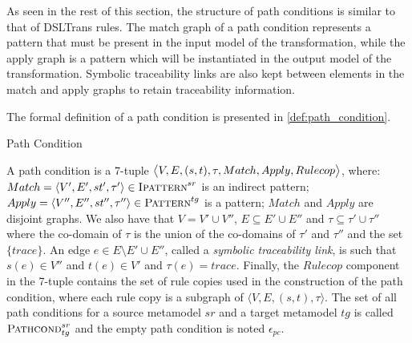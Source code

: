 
As seen in the rest of this section, the structure of path conditions is similar to that of DSLTrans rules. The match graph of a path condition represents a pattern that must be present in the input model of the transformation, while the apply graph is a pattern which will be instantiated in the output model of the transformation. Symbolic traceability links are also kept between elements in the match and apply graphs to retain traceability information.

The formal definition of a path condition is presented in \cref{def:path_condition}.

\begin{definition}{Path Condition\\}
\label{def:path_condition}

A path condition is a 7-tuple $\big\langle V,E,(s,t),\tau, Match,Apply,\\Rulecop\big\rangle$, where: $Match=\langle V',E',st',\tau'\rangle\in \textsc{Ipattern}^{sr}$ is an indirect pattern; $Apply=\langle V'',E'',st'',\tau''\rangle\in \textsc{Pattern}^{tg}$ is a pattern; $Match$ and $Apply$ are disjoint graphs. We also have that $V=V'\cup V''$, $E\subseteq E'\cup E''$ and $\tau\subseteq \tau'\cup \tau''$ where the co-domain of $\tau$ is the union of the co-domains of $\tau'$ and $\tau''$ and the set $\{trace\}$. An edge $e \in E\setminus E'\cup E''$, called a \emph{symbolic traceability link}, is such that $s(e)\in V''$ and $t(e)\in V'$ and $\tau(e)=trace$. Finally, the $Rulecop$ component in the 7-tuple contains the set of rule copies used in the construction of the path condition, where each rule copy is a subgraph of $\big\langle V,E,(s,t),\tau\big\rangle$. The set of all path conditions for a source metamodel $sr$ and a target metamodel $tg$ is called $\textsc{Pathcond}^{sr}_{tg}$ and the empty path condition is noted $\epsilon_{pc}$.


\end{definition}


